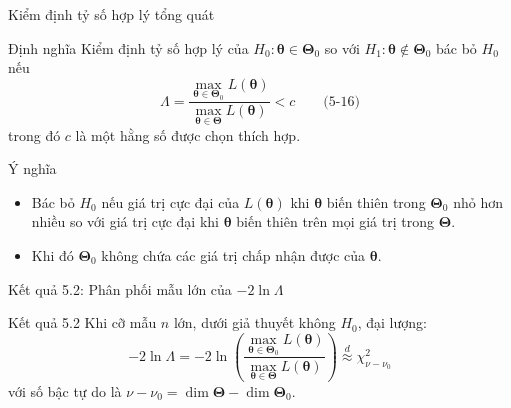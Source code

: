 \begin{frame}[t]{Kiểm định tỷ số hợp lý tổng quát}
  \begin{block}{Định nghĩa}
    Kiểm định tỷ số hợp lý của $H_0: \boldsymbol{\theta} \in \boldsymbol{\Theta}_0$ so với $H_1: \boldsymbol{\theta} \notin \boldsymbol{\Theta}_0$ bác bỏ $H_0$ nếu
    \[
      \Lambda = \frac{\max\limits_{\boldsymbol{\theta} \in \boldsymbol{\Theta}_0} L(\boldsymbol{\theta})}{\max\limits_{\boldsymbol{\theta} \in \boldsymbol{\Theta}} L(\boldsymbol{\theta})} < c
      \qquad \text{(5-16)}
    \]
    trong đó $c$ là một hằng số được chọn thích hợp.
  \end{block}

  \begin{exampleblock}{Ý nghĩa}
    \begin{itemize}
      \item Bác bỏ $H_0$ nếu giá trị cực đại của $L(\boldsymbol{\theta})$ khi $\boldsymbol{\theta}$ biến thiên trong $\boldsymbol{\Theta}_0$ nhỏ hơn nhiều so với giá trị cực đại khi $\boldsymbol{\theta}$ biến thiên trên mọi giá trị trong $\boldsymbol{\Theta}$.
      \item Khi đó $\boldsymbol{\Theta}_0$ không chứa các giá trị chấp nhận được của $\boldsymbol{\theta}$.
    \end{itemize}
  \end{exampleblock}
\end{frame}

\begin{frame}[t]{Kết quả 5.2: Phân phối mẫu lớn của \texorpdfstring{$-2\ln\Lambda$}{-2 ln Lambda}}
  \begin{block}{Kết quả 5.2}
    Khi cỡ mẫu $n$ lớn, dưới giả thuyết không $H_0$, đại lượng:
    \[
      -2\ln\Lambda = -2\ln\left(\frac{\max\limits_{\boldsymbol{\theta} \in \boldsymbol{\Theta}_0} L(\boldsymbol{\theta})}{\max\limits_{\boldsymbol{\theta} \in \boldsymbol{\Theta}} L(\boldsymbol{\theta})}\right) \overset{d}{\approx} \chi^2_{\nu-\nu_0}
    \]
    với số bậc tự do là $\nu - \nu_0 = \dim\boldsymbol{\Theta} - \dim\boldsymbol{\Theta}_0$.
  \end{block}
\end{frame}

